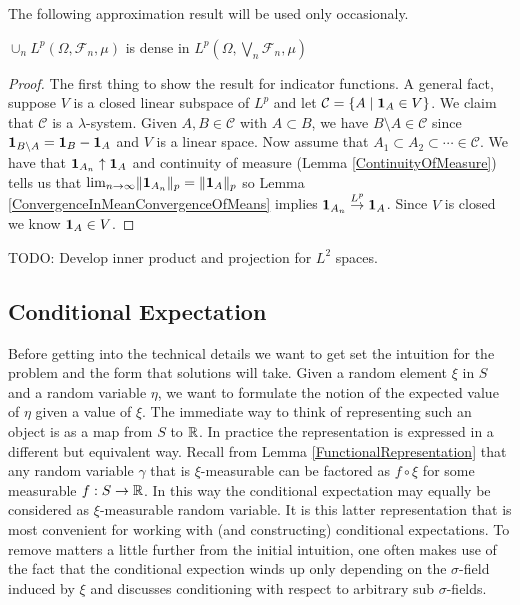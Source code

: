 The following approximation result will be used only occasionaly.
\begin{lem}\label{LpDensityUnionSubsigmaAlgebras}$\cup_n L^p(\Omega, \mathcal{F}_n, \mu)$ is dense in
  $L^p(\Omega, \bigvee_n \mathcal{F}_n, \mu)$
\end{lem}
\begin{proof}The first thing to show the result for indicator
  functions.  A general fact, suppose $V$ is a closed linear subspace of
  $L^p$ and let $\mathcal{C} = \lbrace A \mid \textbf{1}_{A} \in
   V\rbrace$.  We claim that $\mathcal{C}$ is a $\lambda$-system.
    Given $A, B \in \mathcal{C}$ with $A \subset B$, we have $B
    \setminus A \in \mathcal{C}$ since $\textbf{1}_{B \setminus A}
    = \textbf{1}_{B} - \textbf{1}_{A}$ and $V$ is a linear
    space.  Now assume that $A_1 \subset A_2 \subset \cdots \in
    \mathcal{C}$.  We have that $\textbf{1}_{A_n} \uparrow
    \textbf{1}_{A}$ and continuity of measure (Lemma
    \ref{ContinuityOfMeasure}) tells us that
    $\lim_{n \to \infty} \lVert \textbf{1}_{A_n} \rVert_p =
    \lVert \textbf{1}_{A} \rVert_p$ so Lemma
    \ref{ConvergenceInMeanConvergenceOfMeans} implies $\textbf{1}_{A_n}
    \overset{L^p}\to \textbf{1}_{A}$.  Since $V$ is closed we know
    $\textbf{1}_{A} \in V$.
\end{proof}

TODO: Develop inner product and projection for $L^2$ spaces.

\subsection{Conditional Expectation}
 Before getting into the technical details we want to get set the
intuition for the problem and the form that solutions will take.
Given a random element $\xi$ in $S$ and a random variable $\eta$, we want to
formulate the notion of the expected value of $\eta$ given a value of
$\xi$.  The immediate way to think of representing such an object is as a map from
$S$ to $\mathbb{R}$.  In practice the representation is expressed in a
different but equivalent way.  Recall from Lemma
\ref{FunctionalRepresentation} that any random variable
$\gamma$ that is $\xi$-measurable can be factored as $f \circ
\xi$ for some measurable $f : S \to \mathbb{R}$.  In this way the
conditional expectation may equally be considered as $\xi$-measurable
random variable.  It is this latter representation that is most
convenient for working with (and constructing) conditional
expectations.  To remove matters a little further from the initial
intuition, one often makes use of the fact that the conditional
expection winds up only depending on the $\sigma$-field induced by
$\xi$ and discusses conditioning with respect to arbitrary sub
$\sigma$-fields.

